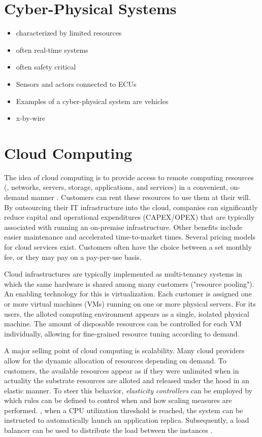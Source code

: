 \section{Cyber-Physical Systems}

\begin{itemize}
\item characterized by limited resources
\item often real-time systems
\item often safety critical
\item Sensors and actors connected to ECUs
\item Examples of a cyber-physical system are vehicles
\item x-by-wire
\end{itemize}


\section{Cloud Computing}

The idea of cloud computing is to provide access to remote computing resources  (\eg , networks, servers, storage, applications, and services) in a convenient, on-demand manner \cite{mell2011nist}. Customers can rent these resources to use them at their will. By outsourcing their IT infrastructure into the cloud, companies can significantly reduce capital and operational expenditures (CAPEX/OPEX) that are typically associated with running an on-premise infrastructure. Other benefits include easier maintenance and accelerated time-to-market times. Several pricing models for cloud services exist. Customers often have the choice between a set monthly fee, or they may pay on a pay-per-use basis.

Cloud infrastructures are typically implemented as multi-tenancy systems in which the same hardware is shared among many customers ("resource pooling"). An enabling technology for this is virtualization. Each customer is assigned one or more virtual machines (VMs) running on one or more physical servers. For its users, the alloted computing environment appears as a single, isolated physical machine. The amount of disposable resources can be controlled for each VM individually, allowing for fine-grained resource tuning according to demand.

A major selling point of cloud computing is scalability. Many cloud providers allow for the dynamic allocation of resources depending on demand. To customers, the available resources appear as if they were unlimited when in actuality the substrate resources are alloted and released under the hood in an elastic manner. To steer this behavior, \emph{elasticity controllers} can be employed by which rules can be defined to control when and how scaling measures are performed. \Eg , when a CPU utilization threshold is reached, the system can be instructed to automatically launch an application replica. Subsequently, a load balancer can be used to distribute the load between the instances \cite{vaquero2011dynamically}.


